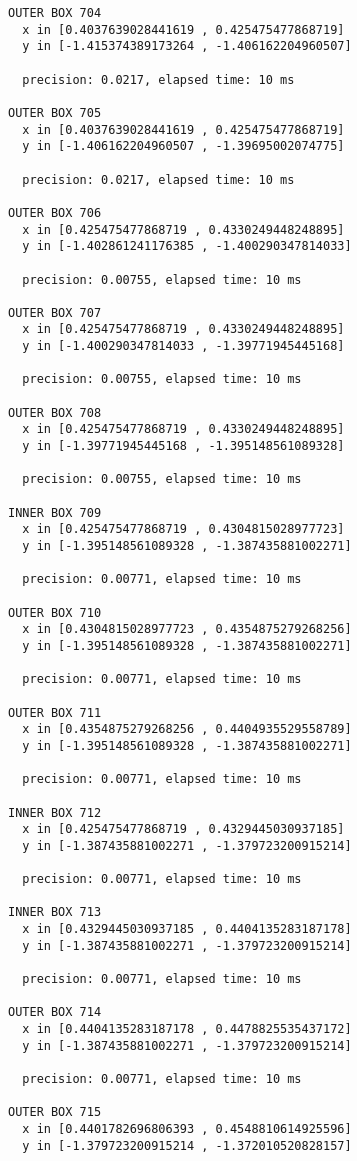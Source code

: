 \begin{verbatim}
OUTER BOX 704
  x in [0.4037639028441619 , 0.425475477868719]
  y in [-1.415374389173264 , -1.406162204960507]

  precision: 0.0217, elapsed time: 10 ms

OUTER BOX 705
  x in [0.4037639028441619 , 0.425475477868719]
  y in [-1.406162204960507 , -1.39695002074775]

  precision: 0.0217, elapsed time: 10 ms

OUTER BOX 706
  x in [0.425475477868719 , 0.4330249448248895]
  y in [-1.402861241176385 , -1.400290347814033]

  precision: 0.00755, elapsed time: 10 ms

OUTER BOX 707
  x in [0.425475477868719 , 0.4330249448248895]
  y in [-1.400290347814033 , -1.39771945445168]

  precision: 0.00755, elapsed time: 10 ms

OUTER BOX 708
  x in [0.425475477868719 , 0.4330249448248895]
  y in [-1.39771945445168 , -1.395148561089328]

  precision: 0.00755, elapsed time: 10 ms

INNER BOX 709
  x in [0.425475477868719 , 0.4304815028977723]
  y in [-1.395148561089328 , -1.387435881002271]

  precision: 0.00771, elapsed time: 10 ms

OUTER BOX 710
  x in [0.4304815028977723 , 0.4354875279268256]
  y in [-1.395148561089328 , -1.387435881002271]

  precision: 0.00771, elapsed time: 10 ms

OUTER BOX 711
  x in [0.4354875279268256 , 0.4404935529558789]
  y in [-1.395148561089328 , -1.387435881002271]

  precision: 0.00771, elapsed time: 10 ms

INNER BOX 712
  x in [0.425475477868719 , 0.4329445030937185]
  y in [-1.387435881002271 , -1.379723200915214]

  precision: 0.00771, elapsed time: 10 ms

INNER BOX 713
  x in [0.4329445030937185 , 0.4404135283187178]
  y in [-1.387435881002271 , -1.379723200915214]

  precision: 0.00771, elapsed time: 10 ms

OUTER BOX 714
  x in [0.4404135283187178 , 0.4478825535437172]
  y in [-1.387435881002271 , -1.379723200915214]

  precision: 0.00771, elapsed time: 10 ms

OUTER BOX 715
  x in [0.4401782696806393 , 0.4548810614925596]
  y in [-1.379723200915214 , -1.372010520828157]


\end{verbatim}
